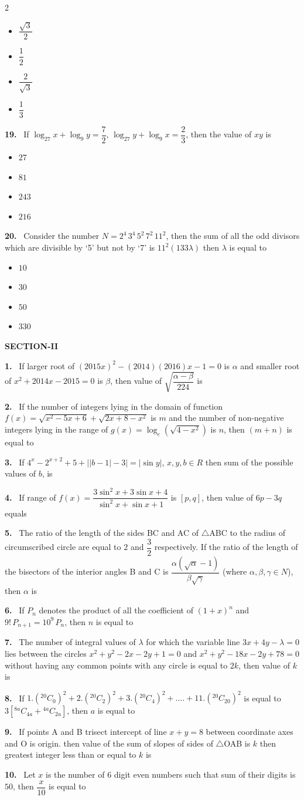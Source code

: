 \documentclass[10pt]{extarticle}
\newcommand{\sect}[1]{\par\smallskip\noindent\textbf{#1}\par}
\newcommand{\qn}[1]{\par\smallskip\noindent\textbf{#1.}~}
\newenvironment{qoptions}{\begin{itemize}[leftmargin=1.8em,itemsep=1pt,topsep=2pt,label={}]}{\end{itemize}}
\newcommand{\opt}[2]{\item[(#1)] #2}
\begin{document}
\begin{multicols}{2}
\begin{qoptions}
\opt{A}{$\dfrac{\sqrt3}{2}$}
\opt{B}{$\dfrac12$}
\opt{C}{$\dfrac{2}{\sqrt3}$}
\opt{D}{$\dfrac13$}
\end{qoptions}
\qn{19} If $\log_{27}x+\log_9y=\dfrac72$, $\log_{27}y+\log_9x=\dfrac23$, then the value of $xy$ is
\begin{qoptions}
\opt{A}{$27$}
\opt{B}{$81$}
\opt{C}{$243$}
\opt{D}{$216$}
\end{qoptions}
\qn{20} Consider the number $N=2^4\,3^4\,5^2\,7^2\,11^2$, then the sum of all the odd divisors which are divisible by `5' but not by `7' is $11^2(133\lambda)$ then $\lambda$ is equal to
\begin{qoptions}
\opt{A}{$10$}
\opt{B}{$30$}
\opt{C}{$50$}
\opt{D}{$330$}
\end{qoptions}
\sect{SECTION-II}
\qn{1} If larger root of $(2015x)^2-(2014)(2016)x-1=0$ is $\alpha$ and smaller root of $x^2+2014x-2015=0$ is $\beta$, then value of $\sqrt{\dfrac{\alpha-\beta}{224}}$ is
\qn{2} If the number of integers lying in the domain of function $f(x)=\sqrt{x^2-5x+6}+\sqrt{2x+8-x^2}$ is $m$ and the number of non-negative integers lying in the range of $g(x)=\log_e\left(\sqrt{4-x^2}\right)$ is $n$, then $(m+n)$ is equal to
\qn{3} If $4^x-2^{x+2}+5+\big||b-1|-3\big|=|\sin y|$, $x,y,b\in R$ then sum of the possible values of $b$, is
\qn{4} If range of $f(x)=\dfrac{3\sin^2x+3\sin x+4}{\sin^2x+\sin x+1}$ is $[p,q]$, then value of $6p-3q$ equals
\qn{5} The ratio of the length of the sides BC and AC of $\triangle$ABC to the radius of circumscribed circle are equal to $2$ and $\dfrac32$ respectively. If the ratio of the length of the bisectors of the interior angles B and C is $\dfrac{\alpha(\sqrt\alpha-1)}{\beta\sqrt\gamma}$ (where $\alpha,\beta,\gamma\in N$), then $\alpha$ is
\qn{6} If $P_n$ denotes the product of all the coefficient of $(1+x)^n$ and $9!\,P_{n+1}=10^9\,P_n$, then $n$ is equal to
\qn{7} The number of integral values of $\lambda$ for which the variable line $3x+4y-\lambda=0$ lies between the circles $x^2+y^2-2x-2y+1=0$ and $x^2+y^2-18x-2y+78=0$ without having any common points with any circle is equal to $2k$, then value of $k$ is
\qn{8} If $1.({}^{20}C_0)^2+2.({}^{20}C_2)^2+3.({}^{20}C_4)^2+\ldots.+11.({}^{20}C_{20})^2$ is equal to $3\left[{}^{8a}C_{4a}+{}^{4a}C_{2a}\right]$, then $a$ is equal to
\qn{9} If points A and B trisect intercept of line $x+y=8$ between coordinate axes and O is origin. then value of the sum of slopes of sides of $\triangle$OAB is $k$ then greatest integer less than or equal to $k$ is
\qn{10} Let $x$ is the number of $6$ digit even numbers such that sum of their digits is $50$, then $\dfrac{x}{10}$ is equal to

\end{multicols}
\end{document}
